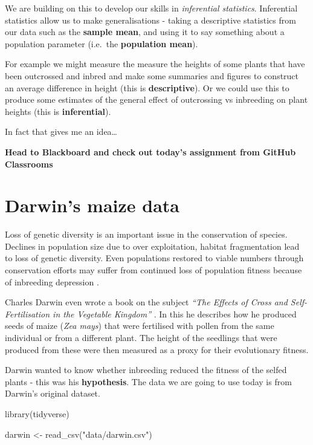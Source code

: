\documentclass[
]{book}
\newenvironment{Shaded}{\begin{snugshade}}{\end{snugshade}}
\newcommand{\FunctionTok}[1]{\textcolor[rgb]{0.00,0.00,0.00}{#1}}
\newcommand{\NormalTok}[1]{#1}
\newcommand{\OtherTok}[1]{\textcolor[rgb]{0.56,0.35,0.01}{#1}}
\newcommand{\StringTok}[1]{\textcolor[rgb]{0.31,0.60,0.02}{#1}}
\begin{document}
We are building on this to develop our skills in \emph{inferential statistics}. Inferential statistics allow us to make generalisations - taking a descriptive statistics from our data such as the \textbf{sample mean}, and using it to say something about a population parameter (i.e.~the \textbf{population mean}).

For example we might measure the measure the heights of some plants that have been outcrossed and inbred and make some summaries and figures to construct an average difference in height (this is \textbf{descriptive}). Or we could use this to produce some estimates of the general effect of outcrossing vs inbreeding on plant heights (this is \textbf{inferential}).

In fact that gives me an idea\ldots{}

\textbf{Head to Blackboard and check out today's assignment from GitHub Classrooms}

\hypertarget{darwins-maize-data}{%
\section{Darwin's maize data}\label{darwins-maize-data}}

Loss of genetic diversity is an important issue in the conservation of species. Declines in population size due to over exploitation, habitat fragmentation lead to loss of genetic diversity. Even populations restored to viable numbers through conservation efforts may suffer from continued loss of population fitness because of inbreeding depression \citet{Rescue}.

Charles Darwin even wrote a book on the subject \emph{``The Effects of Cross and Self-Fertilisation in the Vegetable Kingdom''} \citet{Cross}. In this he describes how he produced seeds of maize (\emph{Zea mays}) that were fertilised with pollen from the same individual or from a different plant. The height of the seedlings that were produced from these were then measured as a proxy for their evolutionary fitness.

Darwin wanted to know whether inbreeding reduced the fitness of the selfed plants - this was his \textbf{hypothesis}. The data we are going to use today is from Darwin's original dataset.

\begin{Shaded}
\begin{Highlighting}[]
\FunctionTok{library}\NormalTok{(tidyverse)}

\NormalTok{darwin }\OtherTok{\textless{}{-}} \FunctionTok{read\_csv}\NormalTok{(}\StringTok{"data/darwin.csv"}\NormalTok{)}
\end{Highlighting}
\end{Shaded}
\end{document}
